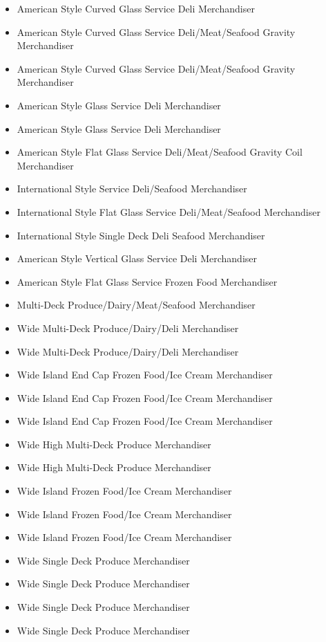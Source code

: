 \begin{itemize}
\item
  American Style Curved Glass Service Deli Merchandiser
\item
  American Style Curved Glass Service Deli/Meat/Seafood Gravity Merchandiser
\item
  American Style Curved Glass Service Deli/Meat/Seafood Gravity Merchandiser
\item
  American Style Glass Service Deli Merchandiser
\item
  American Style Glass Service Deli Merchandiser
\item
  American Style Flat Glass Service Deli/Meat/Seafood Gravity Coil Merchandiser
\item
  International Style Service Deli/Seafood Merchandiser
\item
  International Style Flat Glass Service Deli/Meat/Seafood Merchandiser
\item
  International Style Single Deck Deli Seafood Merchandiser
\item
  American Style Vertical Glass Service Deli Merchandiser
\item
  American Style Flat Glass Service Frozen Food Merchandiser
\item
  Multi-Deck Produce/Dairy/Meat/Seafood Merchandiser
\item
  Wide Multi-Deck Produce/Dairy/Deli Merchandiser
\item
  Wide Multi-Deck Produce/Dairy/Deli Merchandiser
\item
  Wide Island End Cap Frozen Food/Ice Cream Merchandiser
\item
  Wide Island End Cap Frozen Food/Ice Cream Merchandiser
\item
  Wide Island End Cap Frozen Food/Ice Cream Merchandiser
\item
  Wide High Multi-Deck Produce Merchandiser
\item
  Wide High Multi-Deck Produce Merchandiser
\item
  Wide Island Frozen Food/Ice Cream Merchandiser
\item
  Wide Island Frozen Food/Ice Cream Merchandiser
\item
  Wide Island Frozen Food/Ice Cream Merchandiser
\item
  Wide Single Deck Produce Merchandiser
\item
  Wide Single Deck Produce Merchandiser
\item
  Wide Single Deck Produce Merchandiser
\item
  Wide Single Deck Produce Merchandiser

\end{itemize}
